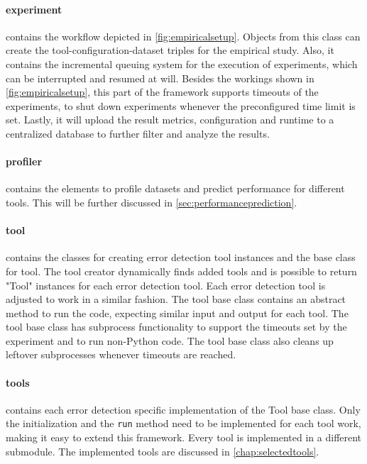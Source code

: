 \paragraph{experiment} contains the workflow depicted in \autoref{fig:empiricalsetup}. Objects from this class can create the tool-configuration-dataset triples for the empirical study. Also, it contains the incremental queuing system for the execution of experiments, which can be interrupted and resumed at will. Besides the workings shown in \autoref{fig:empiricalsetup}, this part of the framework supports timeouts of the experiments, to shut down experiments whenever the preconfigured time limit is set. Lastly, it will upload the result metrics, configuration and runtime to a centralized database to further filter and analyze the results.

\paragraph{profiler} contains the elements to profile datasets and predict performance for different tools. This will be further discussed in \autoref{sec:performanceprediction}.

\paragraph{tool} contains the classes for creating error detection tool instances and the base class for tool. The tool creator dynamically finds added tools and is possible to return "Tool" instances for each error detection tool. Each error detection tool is adjusted to work in a similar fashion. The tool base class contains an abstract method to run the code, expecting similar input and output for each tool. The tool base class has subprocess functionality to support the timeouts set by the experiment and to run non-Python code. The tool base class also cleans up leftover subprocesses whenever timeouts are reached. 

\paragraph{tools} contains each error detection specific implementation of the Tool base class. Only the initialization and the \verb|run| method need to be implemented for each tool work, making it easy to extend this framework. Every tool is implemented in a different submodule. The implemented tools are discussed in \autoref{chap:selectedtools}.

